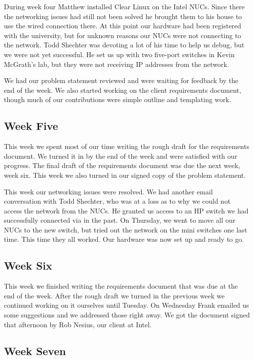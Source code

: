 \documentclass[10pt,onecolumn,journal,draftclsnofoot]{IEEEtran}
\begin{document}
During week four Matthew installed Clear Linux on the Intel NUCs. Since there
the networking issues had still not been solved he brought them to his house to
use the wired connection there. At this point our hardware had been registered
with the university, but for unknown reasons our NUCs were not connecting to the
network. Todd Shechter was devoting a lot of his time to help us debug, but we
were not yet successful. He set us up with two five-port switches in Kevin
McGrath's lab, but they were not receiving IP addresses from the network.

We had our problem statement reviewed and were waiting for feedback by the end
of the week. We also started working on the client requirements document, though
much of our contributions were simple outline and templating work.

\subsection{Week Five}

This week we spent most of our time writing the rough draft for the requirements
document. We turned it in by the end of the week and were satisfied with our
progress. The final draft of the requirements document was due the next week,
week six. This week we also turned in our signed copy of the problem statement.

This week our networking issues were resolved. We had another email conversation
with Todd Shechter, who was at a loss as to why we could not access the network
from the NUCs. He granted us access to an HP switch we had successfully
connected via in the past. On Thursday, we went to move all our NUCs to the new
switch, but tried out the network on the mini switches one last time. This time
they all worked. Our hardware was now set up and ready to go.

\subsection{Week Six}

This week we finished writing the requirements document that was due at the end
of the week. After the rough draft we turned in the previous week we continued
working on it ourselves until Tuesday. On Wednesday Frank emailed us some
suggestions and we addressed those right away. We got the document signed that
afternoon by Rob Nesius, our client at Intel.

\subsection{Week Seven}
\end{document}
